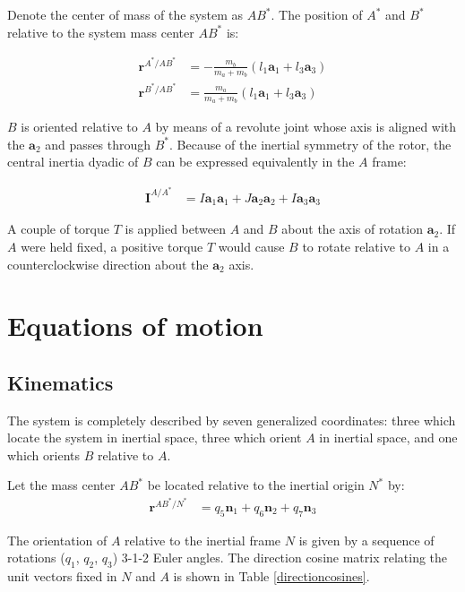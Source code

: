 \documentclass[letterpaper,11pt]{article}
\newcommand{\bs}[1]{ \boldsymbol{ #1 } }
\begin{document}
Denote the center of mass of the system as $AB^*$. The position of $A^*$ and
$B^*$ relative to the system mass center $AB^*$ is:

\begin{align*}
  \bs{r}^{A^* / AB^*} & = -\frac{m_b}{m_a+m_b}(l_1 \bs{a}_1 + l_3 \bs{a}_3) \\
  \bs{r}^{B^* / AB^*} & =  \frac{m_a}{m_a+m_b}(l_1 \bs{a}_1 + l_3 \bs{a}_3)
\end{align*}

$B$ is oriented relative to $A$ by means of a revolute joint whose axis is
aligned with the $\bs{a}_2$ and passes through $B^*$.  Because of the inertial
symmetry of the rotor, the central inertia dyadic of $B$ can be expressed
equivalently in the $A$ frame:

\begin{align*}
  \bs{I}^{A/A^*} & = I\bs{a}_1\bs{a}_1 + J\bs{a}_2\bs{a}_2 + I\bs{a}_3\bs{a}_3
\end{align*}

A couple of torque $T$ is applied between $A$ and $B$ about the axis of
rotation $\bs{a}_2$.  If $A$ were held fixed, a positive torque $T$ would cause
$B$ to rotate relative to $A$ in a counterclockwise direction about the
$\bs{a}_2$ axis.

\section*{Equations of motion}
\subsection*{Kinematics}

The system is completely described by seven generalized coordinates: three
which locate the system in inertial space, three which orient $A$ in inertial
space, and one which orients $B$ relative to $A$.

Let the mass center $AB^*$ be located relative to the inertial origin $N^*$ by:
\begin{align*}
  \bs{r}^{AB^*/N^*} & = q_5 \bs{n}_1 + q_6 \bs{n}_2 + q_7 \bs{n}_3
\end{align*}

The orientation of $A$ relative to the inertial frame $N$ is given by a
sequence of rotations ($q_1$, $q_2$, $q_3$) 3-1-2 Euler angles.  The direction
cosine matrix relating the unit vectors fixed in $N$ and $A$ is shown in Table
\ref{directioncosines}.
\end{document}
